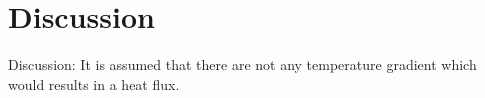 \section{Discussion}
Discussion: It is assumed that there are not any temperature gradient which would results in a heat flux.